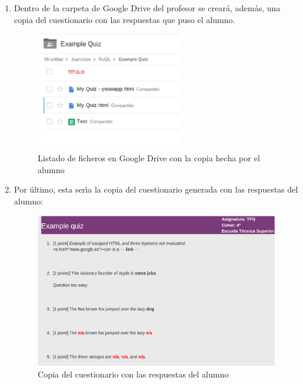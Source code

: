 \begin{enumerate}
  \item Dentro de la carpeta de Google Drive del profesor se crear\'a, adem\'as, una copia del cuestionario con las respuestas que puso el alumno.
  \begin{figure}[!th]
  \begin{center}
  \includegraphics[width=0.6\textwidth]{images/app17.eps}
  \caption{Listado de ficheros en Google Drive con la copia hecha por el alumno}
  \label{fig:app17}
  \end{center}
  \end{figure}
  \newpage
  
  \item Por \'ultimo, esta ser\'{\i}a la copia del cuestionario generada con las respuestas del alumno:
  \begin{figure}[!th]
  \begin{center}
  \includegraphics[width=1\textwidth]{images/app18.eps}
  \caption{Copia del cuestionario con las respuestas del alumno}
  \label{fig:app18}
  \end{center}
  \end{figure}
  
\end{enumerate}


